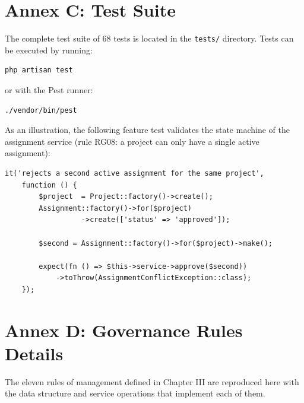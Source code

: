 \documentclass{bts-report}
\begin{document}
\section*{Annex C: Test Suite}
The complete test suite of 68 tests is located in the \texttt{tests/} directory. Tests can be executed by running:
\begin{verbatim}
php artisan test
\end{verbatim}
or with the Pest runner:
\begin{verbatim}
./vendor/bin/pest
\end{verbatim}

As an illustration, the following feature test validates the state machine of the assignment service (rule RG08: a project can only have a single active assignment):

\begin{verbatim}
it('rejects a second active assignment for the same project',
    function () {
        $project  = Project::factory()->create();
        Assignment::factory()->for($project)
                  ->create(['status' => 'approved']);

        $second = Assignment::factory()->for($project)->make();

        expect(fn () => $this->service->approve($second))
            ->toThrow(AssignmentConflictException::class);
    });
\end{verbatim}

\section*{Annex D: Governance Rules Details}
The eleven rules of management defined in Chapter III are reproduced here with the data structure and service operations that implement each of them.
\end{document}
